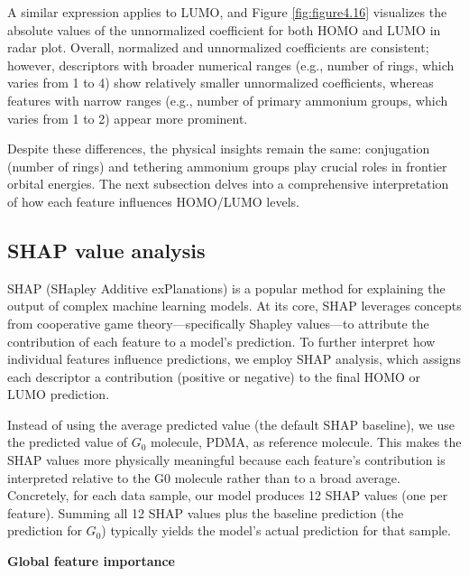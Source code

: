 A similar expression applies to LUMO, and Figure \ref{fig:figure4.16} visualizes the absolute values of the unnormalized coefficient for both HOMO and LUMO in radar plot. Overall, normalized and unnormalized coefficients are consistent; however, descriptors with broader numerical ranges (e.g., number of rings, which varies from 1 to 4) show relatively smaller unnormalized coefficients, whereas features with narrow ranges (e.g., number of primary ammonium groups, which varies from 1 to 2) appear more prominent.

Despite these differences, the physical insights remain the same: conjugation (number of rings) and tethering ammonium groups play crucial roles in frontier orbital energies. The next subsection delves into a comprehensive interpretation of how each feature influences HOMO/LUMO levels.

\subsection{SHAP value analysis}

SHAP (SHapley Additive exPlanations) is a popular method for explaining the output of complex machine learning models. At its core, SHAP leverages concepts from cooperative game theory—specifically Shapley values—to attribute the contribution of each feature to a model’s prediction. To further interpret how individual features influence predictions, we employ SHAP analysis, which assigns each descriptor a contribution (positive or negative) to the final HOMO or LUMO prediction. 

Instead of using the average predicted value (the default SHAP baseline), we use the predicted value of $G_0$ molecule, PDMA, as reference molecule. This makes the SHAP values more physically meaningful because each feature’s contribution is interpreted relative to the G0 molecule rather than to a broad average. Concretely, for each data sample, our model produces 12 SHAP values (one per feature). Summing all 12 SHAP values plus the baseline prediction (the prediction for $G_0$) typically yields the model’s actual prediction for that sample.

\textbf{Global feature importance}

